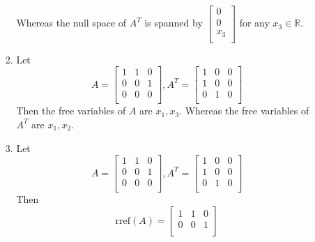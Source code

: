 \documentclass[12pt,letterpaper]{article}
\begin{document}
\begin{enumerate}[label=\S 2.\arabic*]
\begin{enumerate}
\begin{enumerate}
              Whereas the null space of $A^T$ is spanned by
              $\begin{bmatrix}0 \\ 0 \\ x_3 \\\end{bmatrix}$
              for any $x_3 \in \mathbb{R}$.
            \item
              Let
              \[
                A
                =
                \begin{bmatrix}
                  1 & 1 & 0 \\
                  0 & 0 & 1 \\
                  0 & 0 & 0 \\
                \end{bmatrix}
                ,
                A^T
                =
                \begin{bmatrix}
                  1 & 0 & 0 \\
                  1 & 0 & 0 \\
                  0 & 1 & 0 \\
                \end{bmatrix}
              \]
              Then the free variables of $A$ are $x_1, x_3$.
              Whereas the free variables of $A^T$ are $x_1, x_2$.
            \item
              Let
              \[
                A
                =
                \begin{bmatrix}
                  1 & 1 & 0 \\
                  0 & 0 & 1 \\
                  0 & 0 & 0 \\
                \end{bmatrix}
                ,
                A^T
                =
                \begin{bmatrix}
                  1 & 0 & 0 \\
                  1 & 0 & 0 \\
                  0 & 1 & 0 \\
                \end{bmatrix}
              \]
              Then
              \[
                \text{rref}\left(A\right)
                =
                \begin{bmatrix}
                  1 & 1 & 0 \\
                  0 & 0 & 1 \\

\end{bmatrix}\]
\end{enumerate}
\end{enumerate}
\end{enumerate}
\end{document}
